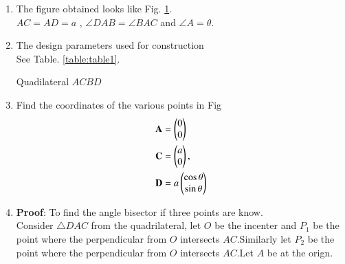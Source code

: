 \renewcommand{\theequation}{\theenumi}
\begin{enumerate}[label=\thesection.\arabic*.,ref=\thesection.\theenumi]

\begin{figure}[!ht]
\centering
\resizebox{\columnwidth}{!}{}
\caption{Quadilateral by Latex-Tikz}
\label{fig:quad}	
\end{figure}
 
\item The figure obtained looks like Fig. \ref{fig:quad}.\\
 $AC = AD = a$ , $\angle{DAB} = \angle{BAC}$ and $\angle A = \theta$. 


\item The design parameters used for construction \\
\solution See Table. \ref{table:table1}.
\begin{table}[ht!]
\centering

\caption{Quadilateral $ACBD$}
\label{table:table1}	
\end{table} 

\item Find the coordinates of the various points in Fig
\begin{align}
\mathbf{A} &=\begin{pmatrix}0\\0\end{pmatrix} \label{eq:constr_a}\\
\mathbf{C} &= \begin{pmatrix}a\\0\end{pmatrix}, \label{eq:constr_c}\\ 
\mathbf{D} &= a\begin{pmatrix}\cos{\theta}\\\sin{\theta}\end{pmatrix}\label{eq:constr_b}
\end{align}

\item \textbf{Proof}: To find the angle bisector if three points are know.\\
\solution Consider $\triangle DAC$ from the quadrilateral, let $O$ be the incenter and $P_1$ be the point where the perpendicular from $O$ intersects $AC$.Similarly let $P_2$ be the point where the perpendicular from $O$ intersects $AC$.Let $A$ be at the orign.


\end{enumerate}
